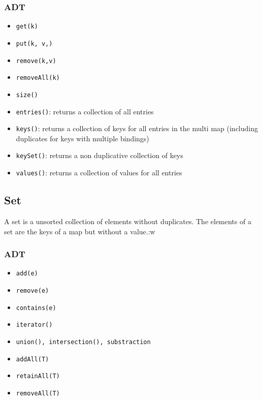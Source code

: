 \documentclass[11pt,twoside,landscape]{article}
\begin{document}
\begin{multicols}{2}
\subsubsection*{ADT}
\label{sec:org62d6676}
\begin{itemize}
\item \texttt{get(k)}
\item \texttt{put(k, v,)}
\item \texttt{remove(k,v)}
\item \texttt{removeAll(k)}
\item \texttt{size()}
\item \texttt{entries()}: returns a collection of all entries
\item \texttt{keys()}: returns a collection of keys for all entries in the multi map (including duplicates for keys with multiple bindings)
\item \texttt{keySet()}: returns a non duplicative collection of keys
\item \texttt{values()}: returns a collection of values for all entries
\end{itemize}
\subsection*{Set}
\label{sec:orgf8ec552}
A set is a unsorted collection of elements without duplicates. The elements of a set are the keys of a map but without a value.:w
\subsubsection*{ADT}
\label{sec:orgad69be3}
\begin{itemize}
\item \texttt{add(e)}
\item \texttt{remove(e)}
\item \texttt{contains(e)}
\item \texttt{iterator()}
\item \texttt{union(), intersection(), substraction}
\item \texttt{addAll(T)}
\item \texttt{retainAll(T)}
\item \texttt{removeAll(T)}
\end{itemize}


\end{multicols}
\end{document}
